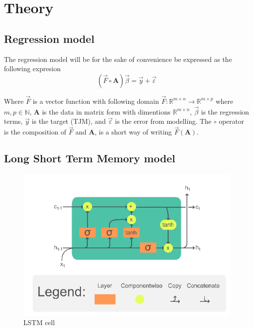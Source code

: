 \section{Theory}\label{sec:theory}

\subsection{Regression model}

The regression model will be for the sake of convenience be expressed as the following expresion
$$
\left(\vec{F}\circ \mathbf{A}\right)\vec{\beta}=\vec{y}+\vec{\varepsilon}
$$

Where $\vec{F}$ is a vector function with following domain $\vec{F}:\mathbb{R}^{m\times n}\to \mathbb{R}^{m\times p}$ where $m,p\in \mathbb{N}$, $\mathbf{A}$ is the data in matrix form with dimentions $\mathbb{R}^{m\times n}$, $\vec{\beta}$ is the regression terms, $\vec{y}$ is the target (TJM), and $\vec{\varepsilon}$ is the error from modelling. The $\circ$ operator is the composition of $\vec{F}$ and $\mathbf{A}$, is a short way of writing $\vec{F}(\mathbf{A})$.

\subsection{Long Short Term Memory model}

\begin{figure}
	\centering
	\includegraphics[width=0.7\linewidth]{figures/LSTM_Cell}
	\caption{LSTM cell}
	\label{fig:lstmcell}
\end{figure}
